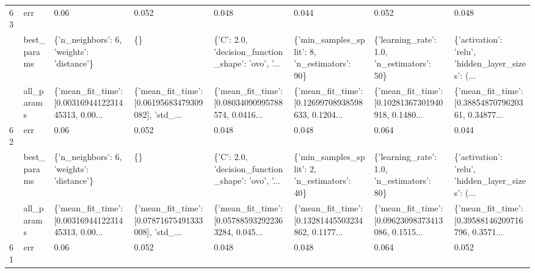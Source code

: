 \begin{tabular}{llllllll}
63 & err &                                               0.06 &                                              0.052 &                                              0.048 &                                              0.044 &                                              0.052 &                                              0.048 \\
   & best\_params &          \{'n\_neighbors': 6, 'weights': 'distance'\} &                                                 \{\} &  \{'C': 2.0, 'decision\_function\_shape': 'ovo', '... &       \{'min\_samples\_split': 8, 'n\_estimators': 90\} &         \{'learning\_rate': 1.0, 'n\_estimators': 50\} &  \{'activation': 'relu', 'hidden\_layer\_sizes': (... \\
   & all\_params &  \{'mean\_fit\_time': [0.0031694412231445313, 0.00... &  \{'mean\_fit\_time': [0.06195683479309082], 'std\_... &  \{'mean\_fit\_time': [0.08034090995788574, 0.0416... &  \{'mean\_fit\_time': [0.12699708938598633, 0.1204... &  \{'mean\_fit\_time': [0.10281367301940918, 0.1480... &  \{'mean\_fit\_time': [0.3885487079620361, 0.34877... \\
62 & err &                                               0.06 &                                              0.052 &                                              0.048 &                                              0.048 &                                              0.064 &                                              0.044 \\
   & best\_params &          \{'n\_neighbors': 6, 'weights': 'distance'\} &                                                 \{\} &  \{'C': 2.0, 'decision\_function\_shape': 'ovo', '... &       \{'min\_samples\_split': 2, 'n\_estimators': 40\} &         \{'learning\_rate': 1.0, 'n\_estimators': 80\} &  \{'activation': 'relu', 'hidden\_layer\_sizes': (... \\
   & all\_params &  \{'mean\_fit\_time': [0.0031694412231445313, 0.00... &  \{'mean\_fit\_time': [0.07871675491333008], 'std\_... &  \{'mean\_fit\_time': [0.057885932922363284, 0.045... &  \{'mean\_fit\_time': [0.13281445503234862, 0.1177... &  \{'mean\_fit\_time': [0.09623098373413086, 0.1515... &  \{'mean\_fit\_time': [0.39588146209716796, 0.3571... \\
61 & err &                                               0.06 &                                              0.052 &                                              0.048 &                                              0.048 &                                              0.064 &                                              0.052 \\

\end{tabular}
